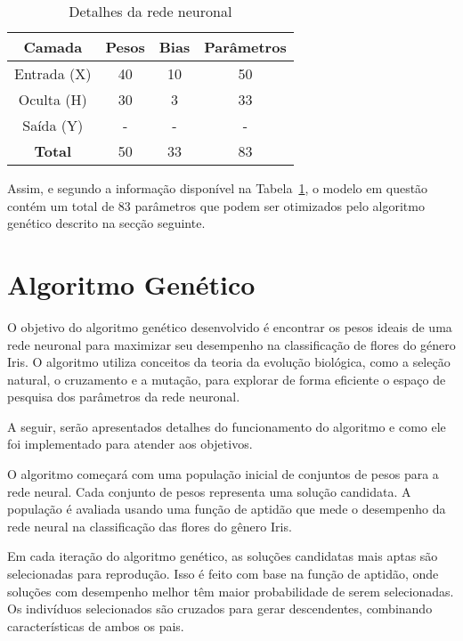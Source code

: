 \begin{table}[htpb]
    \centering
    \begin{tabular}{cccc}
        \hline
        Camada         & Pesos & Bias & Parâmetros \\ \hline
        Entrada (X)    & 40    & 10   & 50         \\
        Oculta (H)     & 30    & 3    & 33         \\
        Saída (Y)      & -     & -    & -          \\ \hline
        \textbf{Total} & 50    & 33   & 83         \\ \hline
    \end{tabular}
    \caption{Detalhes da rede neuronal}
    \label{tab:nn_summary}
\end{table}

Assim, e segundo a informação disponível na Tabela~\ref{tab:nn_summary}, o modelo em questão contém um total de 83 parâmetros que podem ser otimizados pelo algoritmo genético descrito na secção seguinte.


\section{Algoritmo Genético}\label{sec:gen_alg}

O objetivo do algoritmo genético desenvolvido é encontrar os pesos ideais de uma rede neuronal para maximizar seu desempenho na classificação de flores do género Iris. O algoritmo utiliza conceitos da teoria da evolução biológica, como a seleção natural, o cruzamento e a mutação, para explorar de forma eficiente o espaço de pesquisa dos parâmetros da rede neuronal.

A seguir, serão apresentados detalhes do funcionamento do algoritmo e como ele foi implementado para atender aos objetivos.

O algoritmo começará com uma população inicial de conjuntos de pesos para a rede neural. Cada conjunto de pesos representa uma solução candidata. A população é avaliada usando uma função de aptidão que mede o desempenho da rede neural na classificação das flores do gênero Iris.

Em cada iteração do algoritmo genético, as soluções candidatas mais aptas são selecionadas para reprodução. Isso é feito com base na função de aptidão, onde soluções com desempenho melhor têm maior probabilidade de serem selecionadas. Os indivíduos selecionados são cruzados para gerar descendentes, combinando características de ambos os pais.

